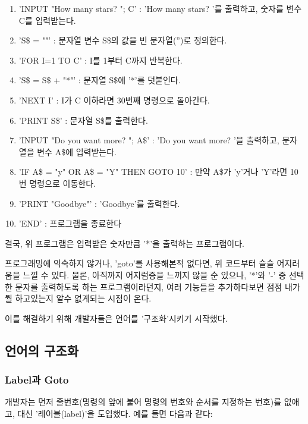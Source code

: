 \documentclass{article}
\begin{document}
\begin{enumerate}
    \item 'INPUT "How many stars? "; C' : 'How many stars? '를 출력하고, 숫자를 변수 C를 입력받는다.
    \item 'S\$ = ""' : 문자열 변수 S\$의 값을 빈 문자열('')로 정의한다.
    \item 'FOR I=1 TO C' : I를 1부터 C까지 반복한다.
    \item 'S\$ = S\$ + "*"' : 문자열 S\$에 '*'를 덧붙인다.
    \item 'NEXT I' : I가 C 이하라면 30번째 명령으로 돌아간다.
    \item 'PRINT S\$' : 문자열 S\$를 출력한다.
    \item 'INPUT "Do you want more? "; A\$' : 'Do you want more? '을 출력하고, 문자열을 변수 A\$에 입력받는다.
    \item 'IF A\$ = "y" OR A\$ = "Y" THEN GOTO 10' : 만약 A\$가 'y'거나 'Y'라면 10번 명령으로 이동한다.
    \item 'PRINT "Goodbye"' : 'Goodbye'를 출력한다.
    \item 'END' : 프로그램을 종료한다
\end{enumerate}

결국, 위 프로그램은 입력받은 숫자만큼 '*'을 출력하는 프로그램이다.

프로그래밍에 익숙하지 않거나, 'goto'를 사용해본적 없다면, 위 코드부터 슬슬 어지러움을 느낄 수 있다.
물론, 아직까지 어지럼증을 느끼지 않을 순 있으나, '*'와 '-' 중 선택한 문자를 출력하도록 하는 프로그램이라던지,
여러 기능들을 추가하다보면 점점 내가 뭘 하고있는지 알수 없게되는 시점이 온다.

이를 해결하기 위해 개발자들은 언어를 '구조화'시키기 시작했다.

\subsection{언어의 구조화}

\subsubsection{Label과 Goto}

개발자는 먼저 줄번호(명령의 앞에 붙어 명령의 번호와 순서를 지정하는 번호)를 없애고, 대신 '레이블(label)'을 도입했다.
예를 들면 다음과 같다:
\end{document}
